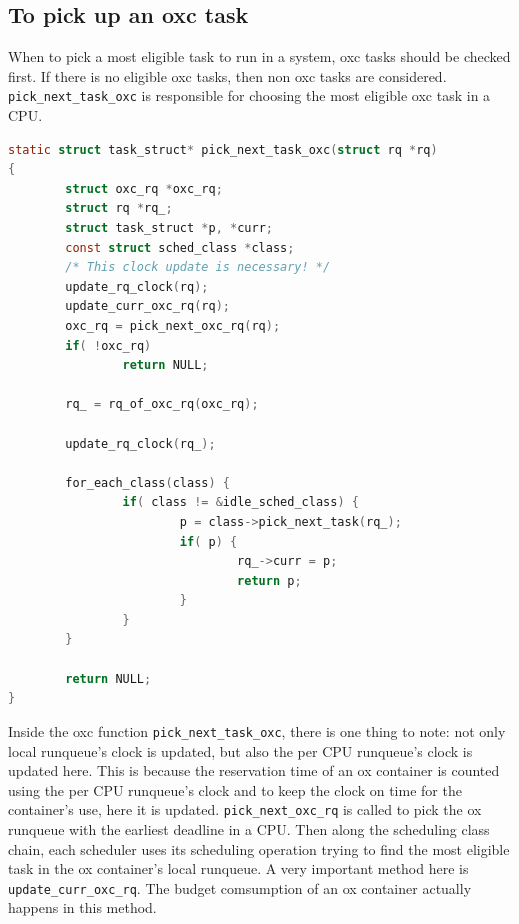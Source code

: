 \subsection{To pick up an oxc task\label{sec:pick_next_task_oxc}}

When to pick a most eligible task to run in a system, oxc tasks should 
be checked first. If there is no eligible oxc tasks, then non oxc tasks 
are considered. \texttt{pick\_next\_task\_oxc} is responsible for choosing 
the most eligible oxc task in a CPU.

\begin{lstlisting}[language=C, label={lst:pick_next_task_oxc},
		caption={To pick up the most eligible oxc task}]
static struct task_struct* pick_next_task_oxc(struct rq *rq)
{
        struct oxc_rq *oxc_rq;
        struct rq *rq_;
        struct task_struct *p, *curr;
        const struct sched_class *class;
        /* This clock update is necessary! */
        update_rq_clock(rq);
        update_curr_oxc_rq(rq);
        oxc_rq = pick_next_oxc_rq(rq);
        if( !oxc_rq)
                return NULL;

        rq_ = rq_of_oxc_rq(oxc_rq);

        update_rq_clock(rq_);

        for_each_class(class) {
                if( class != &idle_sched_class) {
                        p = class->pick_next_task(rq_);
                        if( p) {
                                rq_->curr = p;
                                return p;
                        }
                }
        }

        return NULL;
}
\end{lstlisting}

Inside the oxc function \texttt{pick\_next\_task\_oxc},
there is one thing to note: not only local runqueue's clock
is updated, but also the per CPU runqueue's clock is updated here.
This is because the reservation time of an ox container is counted
using the per CPU runqueue's clock and to keep the clock on time
for the container's use, here it is updated. 
\texttt{pick\_next\_oxc\_rq} is called to pick the ox runqueue with the 
earliest deadline in a CPU. Then along the scheduling class chain, each
scheduler uses its scheduling operation trying to find the most eligible
task in the ox container's local runqueue. A very important method here 
is \texttt{update\_curr\_oxc\_rq}. The budget comsumption of an ox 
container actually happens in this method.


